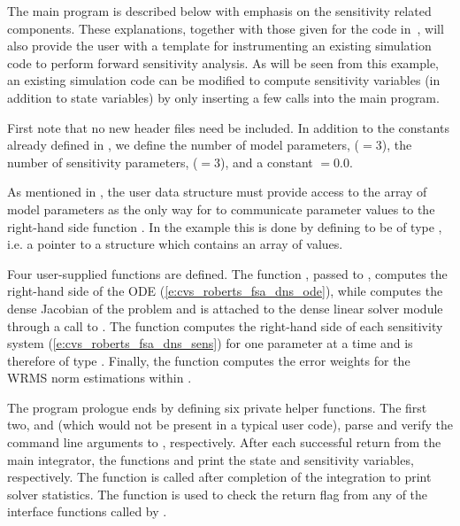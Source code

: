 The main program is described below with emphasis on the sensitivity related components. 
These explanations, together with those given for the code 
in~\cite{cvode_ex}, will also provide the user with a template for instrumenting 
an existing simulation code to perform forward sensitivity analysis.
As will be seen from this example, an existing simulation code can be modified to compute 
sensitivity variables (in addition to state variables) by only inserting a few {\cvodes} 
calls into the main program. 

First note that no new header files need be included. In addition to the constants already
defined in , we define the number of model parameters,  ($=3$),
the number of sensitivity parameters,  ($=3$), and a constant  $=0.0$. 

As mentioned in , the user data structure 
must provide access to the array of model parameters as the only way for
{\cvodes} to communicate parameter values to the right-hand side function
. In the  example this is done by defining
 to be of type , i.e. a pointer to a structure which contains
an array of   values.

Four user-supplied functions are defined. The function , passed to ,
computes the right-hand side of the ODE (\ref{e:cvs_roberts_fsa_dns_ode}), while
 computes the dense Jacobian of the problem and is attached to the
dense linear solver module {\sunlinsoldense} through a call to .
The function  computes the right-hand side of each sensitivity system
(\ref{e:cvs_roberts_fsa_dns_sens}) for one parameter at a time and is therefore of type
. Finally, the function  computes the error weights for the WRMS norm
estimations within {\cvodes}.

The program prologue ends by defining six private helper functions.  The first two,
 and  (which would not be present in a typical user code),
parse and verify the command line arguments to , respectively.
After each successful return from the main {\cvodes} integrator, the functions 
 and  print the state and sensitivity variables,
respectively. The function  is called after completion of the
integration to print solver statistics.
The function  is used to check the return flag from any of the
{\cvodes} interface functions called by .

